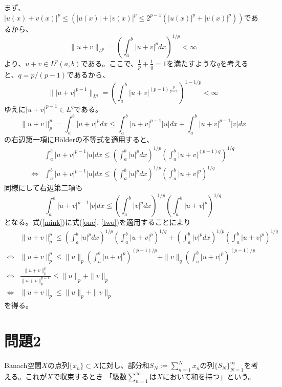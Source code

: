 \documentclass[a4paper,10pt]{jsarticle}
\begin{document}
まず、$|u(x) + v(x)|^p\le(|u(x)|+|v(x)|^p\le2^{p-1}(|u(x)|^p+|v(x)|^p))$であるから、
\begin{equation}
 \|u+v\|_{L^p}=\left(\int_a^b |u+v|^pdx\right)^{1/p} < \infty
\end{equation}
より、$u+v\in L^p(a, b)$である。ここで、$\frac{1}{p}+\frac{1}{q}=1$を満たすような$q$を考えると、$q=p/(p-1)$であるから、
\begin{equation}
 \||u+v|^{p-1}\|_{L^q}=\left(\int_a^b |u+v|^{(p-1)\frac{p}{p-1}}\right)^{1-1/p} < \infty
\end{equation}
ゆえに$|u+v|^{p-1}\in L^q$である。
\begin{equation}
 \|u+v\|_p^p = \int_a^b |u+v|^pdx \le \int_a^b |u+v|^{p-1}|u|dx + \int_a^b |u+v|^{p-1}|v|dx
 \label{mink}
\end{equation}
の右辺第一項にH\"{o}lderの不等式を適用すると、
\begin{align}
 &\int_a^b |u+v|^{p-1}|u|dx \le \left(\int_a^b |u|^pdx\right)^{1/p}\left(\int_a^b |u+v|^{(p-1)q}\right)^{1/q}\\
 \iff & \int_a^b |u+v|^{p-1}|u|dx \le \left(\int_a^b |u|^pdx \right)^{1/p}\left( \int_a^b |u+v|^{p}\right)^{1/q}
 \label{one}
\end{align}
同様にして右辺第二項も
\begin{equation}
 \int_a^b |u+v|^{p-1}|v|dx \le \left( \int_a^b |v|^pdx \right)^{1/p}\left(\int_a^b |u+v|^{p}\right)^{1/q}
 \label{two}
\end{equation}
となる。式(\ref{mink})に式(\ref{one}, \ref{two})を適用することにより
\begin{align}
 &\|u+v\|_p^p \le \left(\int_a^b |u|^pdx \right)^{1/p}\left( \int_a^b |u+v|^{p}\right)^{1/q} + \left( \int_a^b |v|^pdx \right)^{1/p}\left(\int_a^b |u+v|^{p}\right)^{1/q}\\
 \iff & \|u+v\|_p^p \le \|u\|_p\left(\int_a^b |u+v|^{p}\right)^{(p-1)/p} + \|v\|_q\left(\int_a^b |u+v|^{p}\right)^{(p-1)/p} \\
 \iff & \frac{\|u+v\|_p^p}{\|u+v\|_p^{p-1}}\le \|u\|_p + \|v\|_p \\
 \iff & \|u+v\|_p \le \|u\|_p + \|v\|_p
\end{align}
を得る。
\section{問題2}
Banach空間$X$の点列$\{x_n\}\subset X$に対し、部分和$S_N :=\sum_{n=1}^Nx_n$の列$\{S_N\}_{N=1}^{\infty}$を考える。これが$X$で収束するとき
「級数$\sum_{n=1}^\infty$は$X$において和を持つ」という。\\
\end{document}
